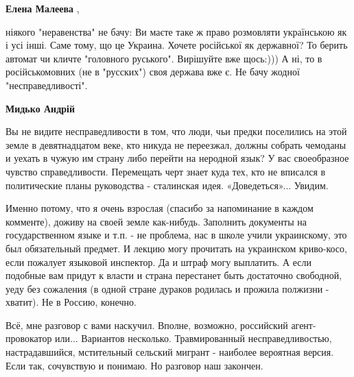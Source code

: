 \begin{itemize}
\begin{itemize}
 
\textbf{Елена Малеева} , 

ніякого "неравенства" не бачу: Ви маєте таке ж право розмовляти українською як
і усі інші. Саме тому, що це Украина. Хочете російської як державної? То берить
автомат чи кличте "головного руського". Вирішуйте вже щось:))) А ні, то в
російськомовних (не в "русских") своя держава вже є. Не бачу жодної
"несправедливості".

 
\textbf{Мидько Андрій} 

Вы не видите несправедливости в том, что люди, чьи предки поселились на этой
земле в девятнадцатом веке, кто никуда не переезжал, должны собрать чемоданы и
уехать в чужую им страну либо перейти на неродной язык? У вас своеобразное
чувство справедливости. Перемещать черт знает куда тех, кто не вписался в
политические планы руководства - сталинская идея. «Доведеться»... Увидим.

Именно потому, что я очень взрослая (спасибо за напоминание в каждом комменте),
доживу на своей земле как-нибудь. Заполнить документы на государственном языке
и т.п. - не проблема, нас в школе учили украинскому, это был обязательный
предмет. И лекцию могу прочитать на украинском криво-косо, если пожалует
языковой инспектор. Да и штраф могу выплатить. А если подобные вам придут к
власти и страна перестанет быть достаточно свободной, уеду без сожаления (в
одной стране дураков родилась и прожила полжизни - хватит). Не в Россию,
конечно.

Всё, мне разговор с вами наскучил. Вполне, возможно, российский
агент-провокатор или... Вариантов несколько. Травмированный несправедливостью,
настрадавшийся, мстительный сельский мигрант - наиболее вероятная версия. Если
так, сочувствую и понимаю. Но разговор наш закончен.

 

\end{itemize}
\end{itemize}
